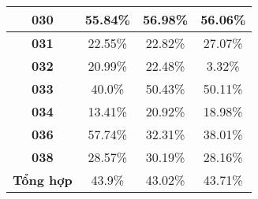 \documentclass[12pt,a4paper]{article}
\begin{document}
\begin{tabular}{|c|c|c|c|}
\hline \textbf{030} & 55.84\% & 56.98\% & 56.06\% \\
\hline \textbf{031} & 22.55\% & 22.82\% & 27.07\% \\
\hline \textbf{032} & 20.99\% & 22.48\% & 3.32\% \\
\hline \textbf{033} & 40.0\% & 50.43\% & 50.11\% \\
\hline \textbf{034} & 13.41\% & 20.92\% & 18.98\% \\
\hline \textbf{036} & 57.74\% & 32.31\% & 38.01\% \\
\hline \textbf{038} & 28.57\% & 30.19\% & 28.16\% \\
\hline \textbf{Tổng hợp} & 43.9\% & 43.02\% & 43.71\% \\
\hline
\end{tabular}
\end{document}
